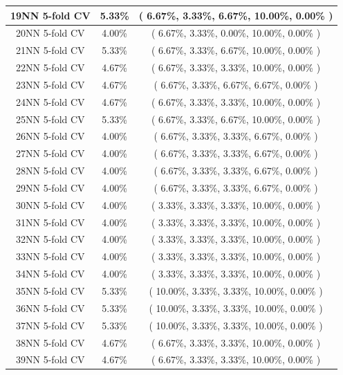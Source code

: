 \documentclass[11pt,a4paper]{article}
\begin{document}
\begin{center}
\begin{tabular} {|| c | c | c ||}
        19NN 5-fold CV & 5.33\% & ( 6.67\%, 3.33\%, 6.67\%, 10.00\%, 0.00\% ) \\ \hline
        20NN 5-fold CV & 4.00\% & ( 6.67\%, 3.33\%, 0.00\%, 10.00\%, 0.00\% ) \\ \hline
        21NN 5-fold CV & 5.33\% & ( 6.67\%, 3.33\%, 6.67\%, 10.00\%, 0.00\% ) \\ \hline
        22NN 5-fold CV & 4.67\% & ( 6.67\%, 3.33\%, 3.33\%, 10.00\%, 0.00\% ) \\ \hline
        23NN 5-fold CV & 4.67\% & ( 6.67\%, 3.33\%, 6.67\%, 6.67\%, 0.00\% ) \\ \hline
        24NN 5-fold CV & 4.67\% & ( 6.67\%, 3.33\%, 3.33\%, 10.00\%, 0.00\% ) \\ \hline
        25NN 5-fold CV & 5.33\% & ( 6.67\%, 3.33\%, 6.67\%, 10.00\%, 0.00\% ) \\ \hline
        26NN 5-fold CV & 4.00\% & ( 6.67\%, 3.33\%, 3.33\%, 6.67\%, 0.00\% ) \\ \hline
        27NN 5-fold CV & 4.00\% & ( 6.67\%, 3.33\%, 3.33\%, 6.67\%, 0.00\% ) \\ \hline
        28NN 5-fold CV & 4.00\% & ( 6.67\%, 3.33\%, 3.33\%, 6.67\%, 0.00\% ) \\ \hline
        29NN 5-fold CV & 4.00\% & ( 6.67\%, 3.33\%, 3.33\%, 6.67\%, 0.00\% ) \\ \hline
        30NN 5-fold CV & 4.00\% & ( 3.33\%, 3.33\%, 3.33\%, 10.00\%, 0.00\% ) \\ \hline
        31NN 5-fold CV & 4.00\% & ( 3.33\%, 3.33\%, 3.33\%, 10.00\%, 0.00\% ) \\ \hline
        32NN 5-fold CV & 4.00\% & ( 3.33\%, 3.33\%, 3.33\%, 10.00\%, 0.00\% ) \\ \hline
        33NN 5-fold CV & 4.00\% & ( 3.33\%, 3.33\%, 3.33\%, 10.00\%, 0.00\% ) \\ \hline
        34NN 5-fold CV & 4.00\% & ( 3.33\%, 3.33\%, 3.33\%, 10.00\%, 0.00\% ) \\ \hline
        35NN 5-fold CV & 5.33\% & ( 10.00\%, 3.33\%, 3.33\%, 10.00\%, 0.00\% ) \\ \hline
        36NN 5-fold CV & 5.33\% & ( 10.00\%, 3.33\%, 3.33\%, 10.00\%, 0.00\% ) \\ \hline
        37NN 5-fold CV & 5.33\% & ( 10.00\%, 3.33\%, 3.33\%, 10.00\%, 0.00\% ) \\ \hline
        38NN 5-fold CV & 4.67\% & ( 6.67\%, 3.33\%, 3.33\%, 10.00\%, 0.00\% ) \\ \hline
        39NN 5-fold CV & 4.67\% & ( 6.67\%, 3.33\%, 3.33\%, 10.00\%, 0.00\% ) \\ \hline
    \end{tabular}
\end{center}
\newpage
\end{document}
